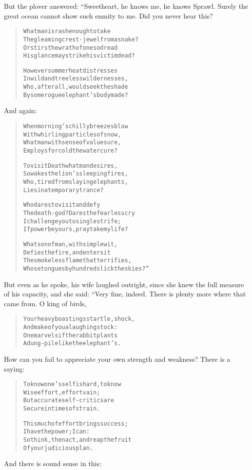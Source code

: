 \documentclass[article, twoside, 14pt]{memoir}
\renewenvironment{verbatim}{%
\begin{quote}%
\vskip -10pt%
\begin{alltt}\normalfont\large}{\end{alltt}%
\end{quote}%
\vskip -10pt
} %
\begin{document}
But the plover answered: “Sweetheart, he knows me, he knows Sprawl.
Surely the great ocean cannot show such enmity to me. Did you never
hear this?

\begin{verbatim}
What man is rash enough to take
The gleaming crest-jewel from a snake?
Or stirs the wrath of one so dread
His glance may strike his victim dead?

However summer heat distresses
In wild and treeless wildernesses,
Who, after all, would seek the shade
By some rogue elephant's body made?
\end{verbatim}
And again:

\begin{verbatim}
When morning's chilly breezes blow
With whirling particles of snow,
What man with sense of value sure,
Employs for cold the water cure?

To visit Death what man desires,
So wakes the lion's sleeping fires,
Who, tired from slaying elephants,
Lies in a temporary trance?

Who dares to visit and defy
The death-god? Dares the fearless cry{\textemdash}
I challenge you to single strife;
If power be yours, pray take my life?

What son of man, with simple wit,
Defies the fire, and enters it{\textemdash}
The smokeless flame that terrifies,
Whose tongues by hundreds lick the skies?”
\end{verbatim}
But even as he spoke, his wife laughed outright, since she knew the
full measure of his capacity, and she said: “Very fine, indeed.
There is plenty more where that came from. O king of birds,

\begin{verbatim}
Your heavy boastings startle, shock,
And make of you a laughingstock:
One marvels if the rabbit plants
A dung-pile like the elephant's.
\end{verbatim}
How can you fail to appreciate your own strength and weakness?
There is a saying:

\begin{verbatim}
To know one's self is hard, to know
Wise effort, effort vain;
But accurate self-critics are
Secure in times of strain.

This much of effort brings success;
I have the power; I can:
So think, then act, and reap the fruit
Of your judicious plan.
\end{verbatim}
And there is sound sense in this:
\end{document}
